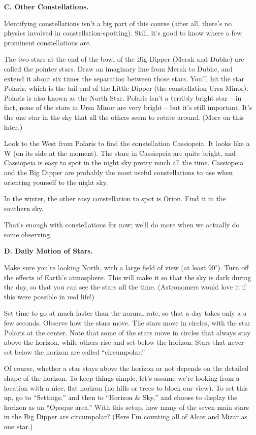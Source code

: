 {\bf C. Other Constellations.}

Identifying constellations isn't a big part of this course (after
all, there's no physics involved in constellation-spotting).  Still, it's
good to know where a few prominent constellations are.

The two stars at the end of the bowl of the Big Dipper (Merak and Dubhe)
are called the pointer stars.  Draw an imaginary line from Merak to Dubhe,
and extend it about six times the separation between those stars.
You'll hit the star Polaris, which is the tail end of the
Little Dipper (the constellation Ursa Minor).  Polaris is also known
as the North Star.  Polaris isn't a terribly bright star -- in fact,
none of the stars in Ursa Minor are very bright -- but it's still
important.  It's the one star in the sky that all the others seem
to rotate around.  (More on this later.)

Look to the West from Polaris to find the constellation Cassiopeia.  It
looks like a W (on its side at the moment).  The stars in Cassiopeia
are quite bright, and Cassiopeia is easy to spot in the night sky pretty
much all the time.  Cassiopeia and the Big Dipper are probably the most
useful constellations to use when orienting yourself to the night sky.

In the winter, the other easy constellation to spot is Orion. Find
it in the southern sky.

That's enough with constellations for now; we'll do more when we actually
do some observing.

\bigskip

{\bf D. Daily Motion of Stars.}

Make sure you're looking North, with a large field
of view (at least $90^\circ$).  Turn off the effects of Earth's 
atmosphere.
This will make it so that the sky is dark during the day, so that
you can see the stars all the time.  (Astronomers would love
it if this were possible in real life!)

Set time to go at much faster than the normal rate,
so that a day takes only a a few seconds.
Observe how the stars move.
The stars move in circles, with the star Polaris at the center.
Note that some of the stars move in circles that always stay
above the horizon, while others rise and set below the horizon.
Stars that never set below the horizon are called ``circumpolar.''

Of course, whether a star stays above the horizon or not depends on
the detailed shape of the horizon. To keep things simple, let's assume
we're looking from a location with a nice, flat horizon (no
hills or trees to block our view). To set this up, go to
``Settings,'' and then to ``Horizon \& Sky,'' and choose to display
the horizon as an ``Opaque area.''
With  this setup, how many of the seven main stars in the
Big Dipper are circumpolar? (Here I'm counting all of
Alcor and Mizar as one star.)

